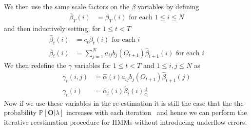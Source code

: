We then use the same scale factors on the $\beta$ variables by defining
\begin{align*}
\overline{\beta}_{T}(i) &= \beta_{T}(i) \text{ for each $1 \leq i \leq N$}
\end{align*}
and then inductively setting, for $1\leq t < T$
\begin{align*}
\hat{\beta}_{t}(i) &= c_t\overline{\beta}_t(i) \text{ for each $i$}\\
\overline{\beta}_{t}(i) &= \sum_{j=1}^{N}a_{ij}b_j(O_{t+1})\hat{\beta}_{t+1}(i) \text{ for each $i$}
\end{align*}
We then redefine the $\gamma$ variables for $1 \leq t < T$ and $1 \leq i,j \leq N$ as 
\begin{align*}
\gamma_t(i,j)&=\hat{\alpha}(i)a_{ij}b_j(O_{t+1})\hat{\beta}_{t+1}(j)\\
\gamma_t(i) &= \hat{\alpha}_t(i)\hat{\beta}_t(i)\frac{1}{c_t}
\end{align*}
Now if we use these variables in the re-estimation it is still the case that the the probability $\mathbb{P}[\mathbf{O}|\lambda]$ increases with each iteration~\citep{rabiner1989tutorial} and hence we can perform the iterative reestimation procedure for HMMs without introducing underflow errors.

